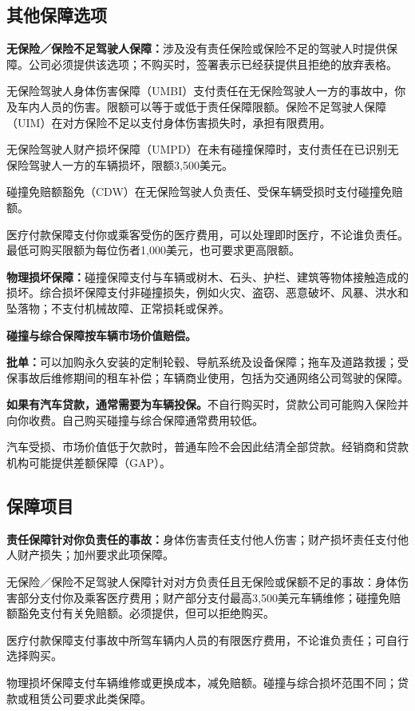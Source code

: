 \documentclass[UTF8,fontset=none,11pt,a4paper]{ctexart}
\begin{document}
\subsection*{其他保障选项}
\textbf{无保险／保险不足驾驶人保障：}涉及没有责任保险或保险不足的驾驶人时提供保障。公司必须提供该选项；不购买时，签署表示已经获提供且拒绝的放弃表格。


无保险驾驶人身体伤害保障（UMBI）支付责任在无保险驾驶人一方的事故中，你及车内人员的伤害。限额可以等于或低于责任保障限额。保险不足驾驶人保障（UIM）在对方保险不足以支付身体伤害损失时，承担有限费用。


无保险驾驶人财产损坏保障（UMPD）在未有碰撞保障时，支付责任在已识别无保险驾驶人一方的车辆损坏，限额3,500美元。


碰撞免赔额豁免（CDW）在无保险驾驶人负责任、受保车辆受损时支付碰撞免赔额。


医疗付款保障支付你或乘客受伤的医疗费用，可以处理即时医疗，不论谁负责任。最低可购买限额为每位伤者1,000美元，也可要求更高限额。


\textbf{物理损坏保障：}碰撞保障支付与车辆或树木、石头、护栏、建筑等物体接触造成的损坏。综合损坏保障支付非碰撞损失，例如火灾、盗窃、恶意破坏、风暴、洪水和坠落物；不支付机械故障、正常损耗或保养。


\textbf{碰撞与综合保障按车辆市场价值赔偿。}


\textbf{批单：}可以加购永久安装的定制轮毂、导航系统及设备保障；拖车及道路救援；受保事故后维修期间的租车补偿；车辆商业使用，包括为交通网络公司驾驶的保障。


\textbf{如果有汽车贷款，通常需要为车辆投保。}不自行购买时，贷款公司可能购入保险并向你收费。自己购买碰撞与综合保障通常费用较低。


汽车受损、市场价值低于欠款时，普通车险不会因此结清全部贷款。经销商和贷款机构可能提供差额保障（GAP）。


\subsection*{保障项目}
\textbf{责任保障针对你负责任的事故：}身体伤害责任支付他人伤害；财产损坏责任支付他人财产损失；加州要求此项保障。


无保险／保险不足驾驶人保障针对对方负责任且无保险或保额不足的事故：身体伤害部分支付你及乘客医疗费用；财产部分支付最高3,500美元车辆维修；碰撞免赔额豁免支付有关免赔额。必须提供，但可以拒绝购买。


医疗付款保障支付事故中所驾车辆内人员的有限医疗费用，不论谁负责任；可自行选择购买。


物理损坏保障支付车辆维修或更换成本，减免赔额。碰撞与综合损坏范围不同；贷款或租赁公司要求此类保障。
\end{document}
